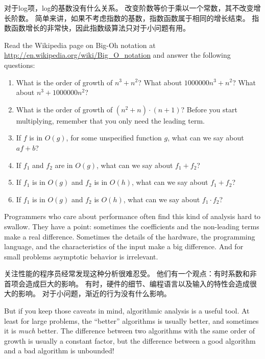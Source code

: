 \documentclass[10pt]{book}
\begin{document}
\begin{CJK}{UTF8}{gbsn}
对于log项，log的基数没有什么关系。
改变阶数等价于乘以一个常数，其不改变增长阶数。
简单来讲，如果不考虑指数的基数，指数函数属于相同的增长结束。
指数函数增长的非常快，因此指数级算法只对于小问题有用。

\begin{exercise}

Read the Wikipedia page on Big-Oh notation at
\url{http://en.wikipedia.org/wiki/Big_O_notation} and
answer the following questions:

\begin{enumerate}
\item What is the order of growth of $n^3 + n^2$?
What about $1000000 n^3 + n^2$?
What about $n^3 + 1000000 n^2$?

\item What is the order of growth of $(n^2 + n) \cdot (n + 1)$?  Before
  you start multiplying, remember that you only need the leading term.

\item If $f$ is in $O(g)$, for some unspecified function $g$, what can
  we say about $af+b$?

\item If $f_1$ and $f_2$ are in $O(g)$, what can we say about $f_1 + f_2$?

\item If  $f_1$ is in $O(g)$
and $f_2$ is in $O(h)$,
what can we say about  $f_1 + f_2$?

\item If  $f_1$ is in $O(g)$ and $f_2$ is $O(h)$,
what can we say about  $f_1 \cdot f_2$?
\end{enumerate}

\end{exercise}

Programmers who care about performance often find this kind of
analysis hard to swallow.  They have a point: sometimes the
coefficients and the non-leading terms make a real difference.
Sometimes the details of the hardware, the programming language, and
the characteristics of the input make a big difference.  And for small
problems asymptotic behavior is irrelevant.

关注性能的程序员经常发现这种分析很难忍受。
他们有一个观点：有时系数和非首项会造成巨大的影响。
有时，硬件的细节、编程语言以及输入的特性会造成很大的影响。
对于小问题，渐近的行为没有什么影响。

But if you keep those caveats in mind, algorithmic analysis is a
useful tool.  At least for large problems, the ``better'' algorithms
is usually better, and sometimes it is {\em much} better.  The
difference between two algorithms with the same order of growth is
usually a constant factor, but the difference between a good algorithm
and a bad algorithm is unbounded!


\end{CJK}
\end{document}
